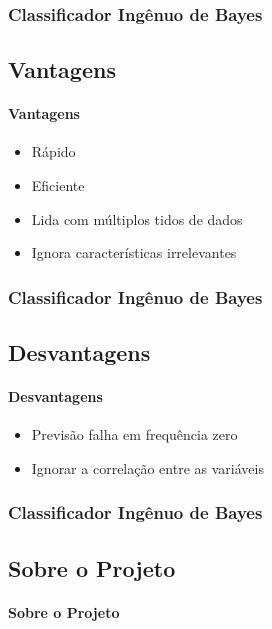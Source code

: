 \documentclass{beamer}
\begin{document}
\begin{frame}
    \frametitle{Classificador Ingênuo de Bayes}
    \subsection{Vantagens}
    \framesubtitle{Vantagens}
    \begin{itemize}
    \item Rápido
    \item Eficiente
    \item Lida com múltiplos tidos de dados
    \item Ignora características irrelevantes
    
    \end{itemize}
    \end{frame}
    \begin{frame}
    \frametitle{Classificador Ingênuo de Bayes}
    \subsection{Desvantagens}
    \framesubtitle{Desvantagens}
    \begin{itemize}
    \item Previsão falha em frequência zero
    \item Ignorar a correlação entre as variáveis
    \end{itemize}
    \end{frame}

\begin{frame}
\frametitle{Classificador Ingênuo de Bayes}
\subsection{Sobre o Projeto}
\framesubtitle{Sobre o Projeto}
 
\end{frame}
\end{document}

